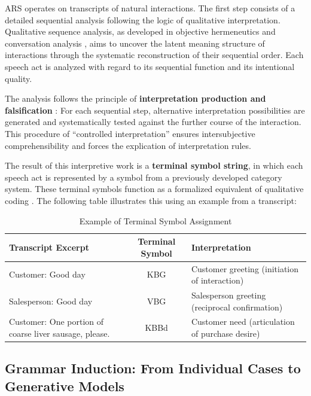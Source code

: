 \documentclass[
  12pt,
  a4paper,
  oneside,
  titlepage
]{article}
\begin{document}
ARS operates on transcripts of natural interactions. The first step consists of a 
detailed sequential analysis following the logic of qualitative interpretation. 
Qualitative sequence analysis, as developed in objective hermeneutics 
\citep{Oevermann1979} and conversation analysis \citep{Sacks1974}, aims to uncover 
the latent meaning structure of interactions through the systematic reconstruction 
of their sequential order. Each speech act is analyzed with regard to its sequential 
function and its intentional quality.

The analysis follows the principle of \textbf{interpretation production and falsification} 
\citep[ p.~392]{Oevermann1979}: For each sequential step, alternative interpretation 
possibilities are generated and systematically tested against the further course of 
the interaction. This procedure of \enquote{controlled interpretation} 
\citep[ p.~158]{Flick2019} ensures intersubjective comprehensibility and forces the 
explication of interpretation rules.

The result of this interpretive work is a \textbf{terminal symbol string}, in which 
each speech act is represented by a symbol from a previously developed category system. 
These terminal symbols function as a formalized equivalent of qualitative coding 
\citep[ p.~207]{Przyborski2021}. The following table illustrates this using an example 
from a transcript:

\begin{table}[h]
\centering
\caption{Example of Terminal Symbol Assignment}
\label{tab:terminal}
\begin{tabular}{@{} p{6cm} c p{4cm} @{}}
\toprule
\textbf{Transcript Excerpt} & \textbf{Terminal Symbol} & \textbf{Interpretation} \\
\midrule
Customer: Good day & KBG & Customer greeting (initiation of interaction) \\
Salesperson: Good day & VBG & Salesperson greeting (reciprocal confirmation) \\
Customer: One portion of coarse liver sausage, please. & KBBd & Customer need (articulation of purchase desire) \\
\bottomrule
\end{tabular}
\end{table}

\subsection{Grammar Induction: From Individual Cases to Generative Models}
\end{document}
